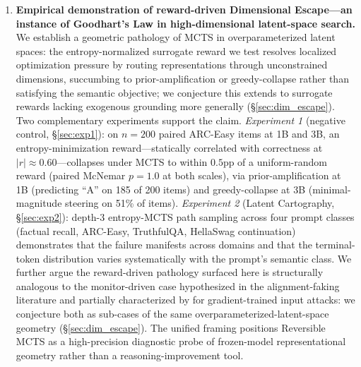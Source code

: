 \begin{enumerate}[leftmargin=*]
    \item \textbf{Empirical demonstration of reward-driven Dimensional Escape---an instance of Goodhart's Law in high-dimensional latent-space search.} We establish a geometric pathology of MCTS in overparameterized latent spaces: the entropy-normalized surrogate reward we test resolves localized optimization pressure by routing representations through unconstrained dimensions, succumbing to prior-amplification or greedy-collapse rather than satisfying the semantic objective; we conjecture this extends to surrogate rewards lacking exogenous grounding more generally (§\ref{sec:dim_escape}). Two complementary experiments support the claim. \emph{Experiment 1} (negative control, §\ref{sec:exp1}): on $n = 200$ paired ARC-Easy items at 1B and 3B, an entropy-minimization reward---statically correlated with correctness at $|r| \approx 0.60$---collapses under MCTS to within $0.5$pp of a uniform-random reward (paired McNemar $p = 1.0$ at both scales), via prior-amplification at 1B (predicting ``A'' on 185 of 200 items) and greedy-collapse at 3B (minimal-magnitude steering on 51\% of items). \emph{Experiment 2} (Latent Cartography, §\ref{sec:exp2}): depth-$3$ entropy-MCTS path sampling across four prompt classes (factual recall, ARC-Easy, TruthfulQA, HellaSwag continuation) demonstrates that the failure manifests across domains and that the terminal-token distribution varies systematically with the prompt's semantic class. We further argue the reward-driven pathology surfaced here is structurally analogous to the monitor-driven case hypothesized in the alignment-faking literature and partially characterized by \citet{bailey2024obfuscated} for gradient-trained input attacks: we conjecture both as sub-cases of the same overparameterized-latent-space geometry (§\ref{sec:dim_escape}). The unified framing positions Reversible MCTS as a high-precision diagnostic probe of frozen-model representational geometry rather than a reasoning-improvement tool.
\end{enumerate}
